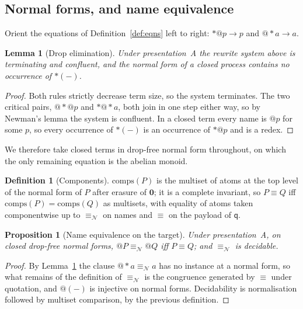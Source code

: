 \documentclass[11pt]{article}
\makeatletter
\theoremstyle{plain}
\newtheorem{proposition}[theorem]{Proposition}
\newtheorem{lemma}[theorem]{Lemma}
\theoremstyle{definition}
\newtheorem{definition}[theorem]{Definition}
\theoremstyle{remark}
\newcommand{\quo}[1]{@#1}
\newcommand{\drp}[1]{{*}#1}
\newcommand{\nil}{\mathbf{0}}
\newcommand{\nequiv}{\equiv_{\mathcal{N}}}
\newcommand{\qq}{\mathsf{q}}
\newcommand{\scong}{\equiv}
\newcommand{\comps}[1]{\mathrm{comps}(#1)}
\makeatother
\begin{document}
\subsection{Normal forms, and name equivalence}

Orient the equations of Definition~\ref{def:eqns} left to right:
$\drp{\quo{p}} \to p$ and $\quo{\drp{a}} \to a$.

\begin{lemma}[Drop elimination]
\label{lem:dropelim}
Under presentation~A the rewrite system above is terminating and confluent,
and the normal form of a closed process contains no occurrence of
$\drp{(-)}$.
\end{lemma}

\begin{proof}
Both rules strictly decrease term size, so the system terminates. The two
critical pairs, $\quo{\drp{\quo{p}}}$ and $\drp{\quo{\drp{a}}}$, both join in
one step either way, so by Newman's lemma the system is confluent. In a closed
term every name is $\quo{p}$ for some $p$, so every occurrence of $\drp{(-)}$
is an occurrence of $\drp{\quo{p}}$ and is a redex.
\end{proof}

We therefore take closed terms in drop-free normal form throughout, on which
the only remaining equation is the abelian monoid.

\begin{definition}[Components]
$\comps{P}$ is the multiset of atoms at the top level of the normal form of
$P$ after erasure of $\nil$; it is a complete invariant, so $P \scong Q$ iff
$\comps{P} = \comps{Q}$ as multisets, with equality of atoms taken
componentwise up to $\nequiv$ on names and $\scong$ on the payload of $\qq$.
\end{definition}

\begin{proposition}[Name equivalence on the target]
\label{prop:nequiv}
Under presentation~A, on closed drop-free normal forms, $\quo{P} \nequiv
\quo{Q}$ iff $P \scong Q$; and $\nequiv$ is decidable.
\end{proposition}

\begin{proof}
By Lemma~\ref{lem:dropelim} the clause $\quo{\drp{a}} \nequiv a$ has no
instance at a normal form, so what remains of the definition of $\nequiv$ is
the congruence generated by $\scong$ under quotation, and $\quo{(-)}$ is
injective on normal forms. Decidability is normalisation followed by multiset
comparison, by the previous definition.
\end{proof}
\end{document}
